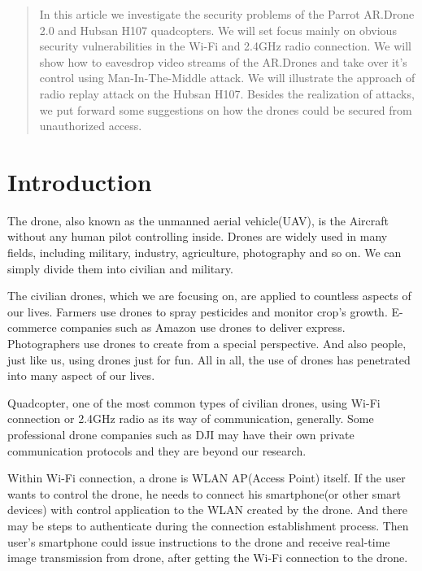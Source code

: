 \documentclass{acm_proc_article-sp}
\begin{document}
\maketitle
\begin{abstract}
In this article we investigate the security problems of the Parrot AR.Drone 2.0 and Hubsan H107 quadcopters. We will set focus mainly on obvious security vulnerabilities in the Wi-Fi and 2.4GHz radio connection. We will show how to eavesdrop video streams of the AR.Drones and take over it's control using Man-In-The-Middle attack. We will illustrate the approach of radio replay attack on the Hubsan H107. Besides the realization of attacks, we put forward some suggestions on how the drones could be secured from unauthorized access.
\end{abstract}





\section{Introduction}

 The drone, also known as the unmanned aerial vehicle(UAV), is the Aircraft without  any human pilot controlling inside. Drones are widely used in many fields, including military, industry, agriculture, photography and so on. We can simply divide them into civilian and military. 
 
 
 The civilian drones, which we are focusing on, are applied to countless aspects of our lives.  Farmers use drones to spray pesticides and monitor crop's growth. E-commerce companies such as Amazon use drones to deliver express. Photographers use drones to create from a special perspective. And also people, just like us, using drones just for fun. All in all, the use of drones has penetrated into many aspect of our lives.
 
 
  Quadcopter, one of the most common types of civilian drones, using Wi-Fi connection or 2.4GHz radio as its way of communication, generally. Some professional drone companies such as DJI may have their own private communication protocols and they are beyond our research.
  
  
 Within Wi-Fi connection, a drone is WLAN AP(Access Point) itself. If the user wants to control the drone, he needs to connect his smartphone(or other smart devices) with control application to the WLAN created by the drone. And there may be steps to authenticate during the connection establishment process. Then user's smartphone could issue instructions to the drone and receive real-time image transmission from drone, after getting the Wi-Fi connection to the drone.
 
\end{document}
